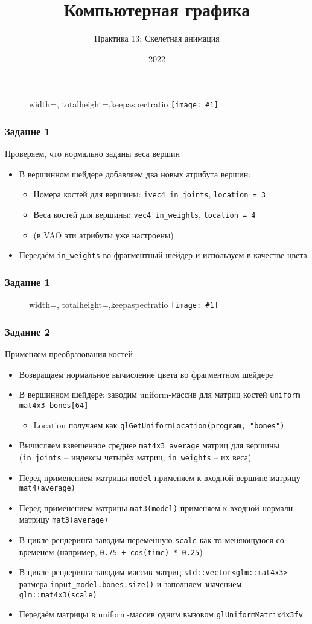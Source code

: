 \documentclass{beamer}
\title{Компьютерная графика}
\subtitle{Практика 13: Скелетная анимация}
\date{2022}
\newcommand{\slideimage}[1]{
  \begin{figure}
    \begin{adjustbox}{width=\textwidth, totalheight=\textheight-2\baselineskip-2\baselineskip,keepaspectratio}
      \texttt{[image: \#1]}
    \end{adjustbox}
  \end{figure}
}
\begin{document}
\frame{\titlepage}

\begin{frame}[fragile]
\slideimage{0.png}
\end{frame}

\begin{frame}[fragile]
\frametitle{Задание 1}
Проверяем, что нормально заданы веса вершин
\begin{itemize}
\item В вершинном шейдере добавляем два новых атрибута вершин:
\begin{itemize}
\item Номера костей для вершины: \verb|ivec4 in_joints|, \verb|location = 3|
\item Веса костей для вершины: \verb|vec4 in_weights|, \verb|location = 4|
\item (в VAO эти атрибуты уже настроены)
\end{itemize}
\item Передаём \verb|in_weights| во фрагментный шейдер и используем в качестве цвета
\end{itemize}
\end{frame}

\begin{frame}[fragile]
\frametitle{Задание 1}
\slideimage{1.png}
\end{frame}

\begin{frame}[fragile]
\frametitle{Задание 2}
\fontsize{8pt}{8pt}
\selectfont
Применяем преобразования костей
\begin{itemize}
\item Возвращаем нормальное вычисление цвета во фрагментном шейдере
\item В вершинном шейдере: заводим uniform-массив для матриц костей \verb|uniform mat4x3 bones[64]|
\begin{itemize}
\fontsize{8pt}{8pt}
\selectfont
\item Location получаем как \verb|glGetUniformLocation(program, "bones")|
\end{itemize}
\item Вычисляем взвешенное среднее \verb|mat4x3 average| матриц для вершины (\verb|in_joints| -- индексы четырёх матриц, \verb|in_weights| -- их веса)
\item Перед применением матрицы \verb|model| применяем к входной вершине матрицу \verb|mat4(average)|
\item Перед применением матрицы \verb|mat3(model)| применяем к входной нормали матрицу \verb|mat3(average)|
\item В цикле рендеринга заводим переменную \verb|scale| как-то меняющуюся со временем (например, \verb|0.75 + cos(time) * 0.25|)
\item В цикле рендеринга заводим массив матриц \verb|std::vector<glm::mat4x3>| размера \verb|input_model.bones.size()| и заполняем значением \verb|glm::mat4x3(scale)|
\item Передаём матрицы в uniform-массив одним вызовом \verb|glUniformMatrix4x3fv|
\end{itemize}
\end{frame}
\end{document}

